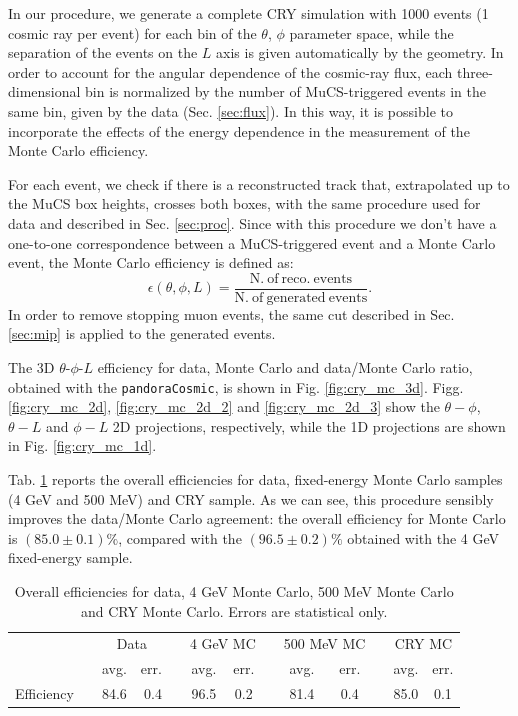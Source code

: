\documentclass[a4paper]{scrartcl}
\renewcommand{\arraystretch}{1.2}
\newcommand{\ra}[1]{\renewcommand{\arraystretch}{#1}}
\begin{document}
In our procedure, we generate a complete CRY simulation with 1000 events (1 cosmic ray per event) for each bin of the $\theta$, $\phi$ parameter space, while the separation of the events on the $L$ axis is given automatically by the geometry. In order to account for the angular dependence of the cosmic-ray flux, each three-dimensional bin is normalized by the number of MuCS-triggered events in the same bin, given by the data (Sec. \ref{sec:flux}). In this way, it is possible to incorporate the effects of the energy dependence in the measurement of the Monte Carlo efficiency.

For each event, we check if there is a reconstructed track that, extrapolated up to the MuCS box heights, crosses both boxes, with the same procedure used for data and described in Sec. \ref{sec:proc}.
Since with this procedure we don't have a one-to-one correspondence between a MuCS-triggered event and a Monte Carlo event, the Monte Carlo efficiency is defined as:
\begin{equation}
\epsilon(\theta,\phi,L) = \frac{\mathrm{N.~of~reco.~events}}{\mathrm{N.~of~generated~events}}.
\end{equation}
In order to remove stopping muon events, the same cut described in Sec. \ref{sec:mip} is applied to the generated events.

The 3D $\theta$-$\phi$-$L$ efficiency for data, Monte Carlo and data/Monte Carlo ratio, obtained with the \texttt{pandoraCosmic}, is shown in Fig. \ref{fig:cry_mc_3d}.
Figg. \ref{fig:cry_mc_2d}, \ref{fig:cry_mc_2d_2} and \ref{fig:cry_mc_2d_3} show the $\theta-\phi$, $\theta-L$ and $\phi-L$ 2D projections, respectively, while the 1D projections are shown in Fig. \ref{fig:cry_mc_1d}.

Tab. \ref{tab:mc} reports the overall efficiencies for data, fixed-energy Monte Carlo samples (4 GeV and 500 MeV) and CRY sample. As we can see, this procedure sensibly improves the data/Monte Carlo agreement: the overall efficiency for Monte Carlo is $(85.0\pm0.1)\%$, compared with the $(96.5\pm0.2)\%$ obtained with the 4 GeV fixed-energy sample.

\begin{table}[htbp]
\centering
\ra{1.2}
\begin{tabular}{lcrrrcccccccc}
\toprule
 & \phantom{a}& \multicolumn{2}{c}{Data} & \phantom{a} & \multicolumn{2}{c}{4 GeV MC} & \phantom{a} & \multicolumn{2}{c}{500 MeV MC} & \phantom{a} & \multicolumn{2}{c}{CRY MC}\\
\cmidrule{3-4} \cmidrule{6-7} \cmidrule{9-10} \cmidrule{12-13}
 & & avg. & err. & & avg. & err. & & avg. & err. & & avg. & err.\\
\midrule
Efficiency & & 84.6 & 0.4 & & 96.5 & 0.2 & & 81.4 & 0.4 & & 85.0 & 0.1\\
\bottomrule
\end{tabular}
\caption{Overall efficiencies for data, 4 GeV Monte Carlo, 500 MeV Monte Carlo and CRY Monte Carlo. Errors are statistical only.}\label{tab:mc}
\end{table}
\end{document}
